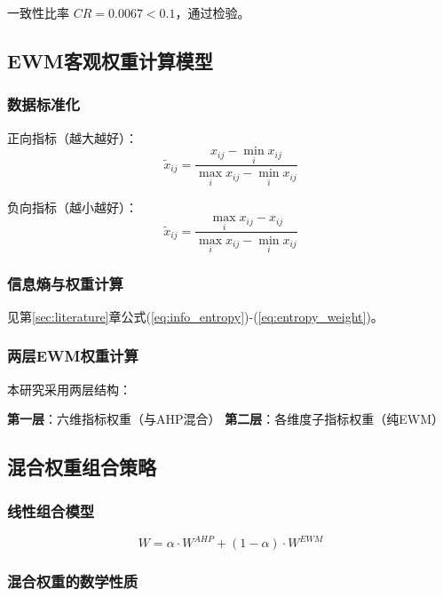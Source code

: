 一致性比率 $CR = 0.0067 < 0.1$，通过检验。

\subsection{EWM客观权重计算模型}

\subsubsection{数据标准化}

正向指标（越大越好）：
\begin{equation}
\tilde{x}_{ij} = \frac{x_{ij} - \min_i x_{ij}}{\max_i x_{ij} - \min_i x_{ij}}
\label{eq:pos_norm}
\end{equation}

负向指标（越小越好）：
\begin{equation}
\tilde{x}_{ij} = \frac{\max_i x_{ij} - x_{ij}}{\max_i x_{ij} - \min_i x_{ij}}
\label{eq:neg_norm}
\end{equation}

\subsubsection{信息熵与权重计算}

见第\ref{sec:literature}章公式(\ref{eq:info_entropy})-(\ref{eq:entropy_weight})。

\subsubsection{两层EWM权重计算}

本研究采用两层结构：

\textbf{第一层}：六维指标权重（与AHP混合）
\textbf{第二层}：各维度子指标权重（纯EWM）

\subsection{混合权重组合策略}

\subsubsection{线性组合模型}

\begin{equation}
W = \alpha \cdot W^{AHP} + (1 - \alpha) \cdot W^{EWM}
\label{eq:hybrid_weight}
\end{equation}

\subsubsection{混合权重的数学性质}

